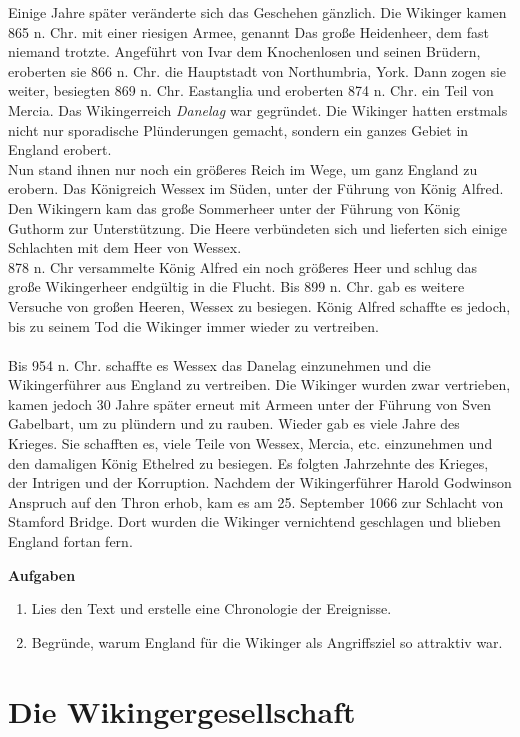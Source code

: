 \documentclass[12pt,a4paper,ngerman,openany]{book}
\newcommand{\aufgaben}[1]{
  \begin{tcolorbox}
    \textbf{Aufgaben}
    \begin{enumerate}
      #1
    \end{enumerate}
  \end{tcolorbox}
} %
\newcommand{\fchapter}[1]{\chapter{#1}\thispagestyle{chapterstyle}}
\begin{document}
Einige Jahre später veränderte sich das Geschehen gänzlich. Die Wikinger kamen 865 n. Chr. mit einer riesigen Armee, genannt \glqq Das große Heidenheer\grqq{}, dem fast niemand trotzte. Angeführt von Ivar dem Knochenlosen und seinen Brüdern, eroberten sie 866 n. Chr. die Hauptstadt von Northumbria, York. Dann zogen sie weiter, besiegten 869 n. Chr. Eastanglia und eroberten 874 n. Chr. ein Teil von Mercia. Das Wikingerreich \textit{Danelag} war gegründet. Die Wikinger hatten erstmals nicht nur sporadische Plünderungen gemacht, sondern ein ganzes Gebiet in England erobert. \\
Nun stand ihnen nur noch ein größeres Reich im Wege, um ganz England zu erobern. Das Königreich Wessex im Süden, unter der Führung von König Alfred. Den Wikingern kam \glqq das große Sommerheer\grqq{} unter der Führung von König Guthorm zur Unterstützung. Die Heere verbündeten sich und lieferten sich einige Schlachten mit dem Heer von Wessex. \\
878 n. Chr versammelte König Alfred ein noch größeres Heer und schlug das große Wikingerheer endgültig in die Flucht.
Bis 899 n. Chr. gab es weitere Versuche von großen Heeren, Wessex zu besiegen. König Alfred schaffte es jedoch, bis zu seinem Tod die Wikinger immer wieder zu vertreiben.\\\\
Bis 954 n. Chr. schaffte es Wessex das Danelag einzunehmen und die Wikingerführer aus England zu vertreiben. Die Wikinger wurden zwar vertrieben, kamen jedoch 30 Jahre später erneut mit Armeen unter der Führung von Sven Gabelbart, um zu plündern und zu rauben. Wieder gab es viele Jahre des Krieges. Sie schafften es, viele Teile von Wessex, Mercia, etc. einzunehmen und den damaligen König Ethelred zu besiegen. Es folgten Jahrzehnte des Krieges, der Intrigen und der Korruption. Nachdem der Wikingerführer Harold Godwinson Anspruch auf den Thron erhob, kam es am 25. September 1066 zur Schlacht von Stamford Bridge. Dort wurden die Wikinger vernichtend geschlagen und blieben England fortan fern.

\aufgaben{
  \item Lies den Text und erstelle eine Chronologie der Ereignisse.
  \item Begründe, warum England für die Wikinger als Angriffsziel so attraktiv war.
}

\fchapter{Die Wikingergesellschaft}
\end{document}
